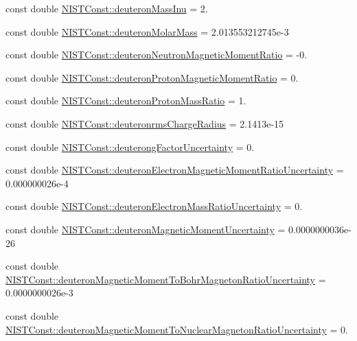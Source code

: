 \begin{DoxyCompactItemize}
\item 
const double \hyperlink{group___n_i_s_t_const-_deuteron_ga65b03219bebd7561b1dae8f084c3d090}{N\+I\+S\+T\+Const\+::deuteron\+Mass\+Inu} = 2.
\item 
const double \hyperlink{group___n_i_s_t_const-_deuteron_ga19086965236aae3504b4c0efb1cfaf41}{N\+I\+S\+T\+Const\+::deuteron\+Molar\+Mass} = 2.\+013553212745e-\/3
\item 
const double \hyperlink{group___n_i_s_t_const-_deuteron_gaad8a0231ec17f5669c9c22a4daba5a77}{N\+I\+S\+T\+Const\+::deuteron\+Neutron\+Magnetic\+Moment\+Ratio} = -\/0.
\item 
const double \hyperlink{group___n_i_s_t_const-_deuteron_gaac523a6a3c61390396544e4b0acb3c05}{N\+I\+S\+T\+Const\+::deuteron\+Proton\+Magnetic\+Moment\+Ratio} = 0.
\item 
const double \hyperlink{group___n_i_s_t_const-_deuteron_gabe2731d4997c2227da2cc2d7e7cda194}{N\+I\+S\+T\+Const\+::deuteron\+Proton\+Mass\+Ratio} = 1.
\item 
const double \hyperlink{group___n_i_s_t_const-_deuteron_gaef4ebab0e996f7ac1934663efbd32aed}{N\+I\+S\+T\+Const\+::deuteronrms\+Charge\+Radius} = 2.\+1413e-\/15
\item 
const double \hyperlink{group___n_i_s_t_const-_deuteron_ga78aec37c148d141458e1a01ddf0f7366}{N\+I\+S\+T\+Const\+::deuterong\+Factor\+Uncertainty} = 0.
\item 
const double \hyperlink{group___n_i_s_t_const-_deuteron_ga7f8d57d07179574f57434689cf15f711}{N\+I\+S\+T\+Const\+::deuteron\+Electron\+Magnetic\+Moment\+Ratio\+Uncertainty} = 0.\+000000026e-\/4
\item 
const double \hyperlink{group___n_i_s_t_const-_deuteron_gaf463ddb812e8768a0519d741b15aa97f}{N\+I\+S\+T\+Const\+::deuteron\+Electron\+Mass\+Ratio\+Uncertainty} = 0.
\item 
const double \hyperlink{group___n_i_s_t_const-_deuteron_ga410ac4c31ff98d05fb7e548b5508c981}{N\+I\+S\+T\+Const\+::deuteron\+Magnetic\+Moment\+Uncertainty} = 0.\+0000000036e-\/26
\item 
const double \hyperlink{group___n_i_s_t_const-_deuteron_gac689dcb4af65af6e079aebd27f6d1c47}{N\+I\+S\+T\+Const\+::deuteron\+Magnetic\+Moment\+To\+Bohr\+Magneton\+Ratio\+Uncertainty} = 0.\+0000000026e-\/3
\item 
const double \hyperlink{group___n_i_s_t_const-_deuteron_gaa04ee8eb2fdfbc5cbf37a9d5e751c36a}{N\+I\+S\+T\+Const\+::deuteron\+Magnetic\+Moment\+To\+Nuclear\+Magneton\+Ratio\+Uncertainty} = 0.

\end{DoxyCompactItemize}
